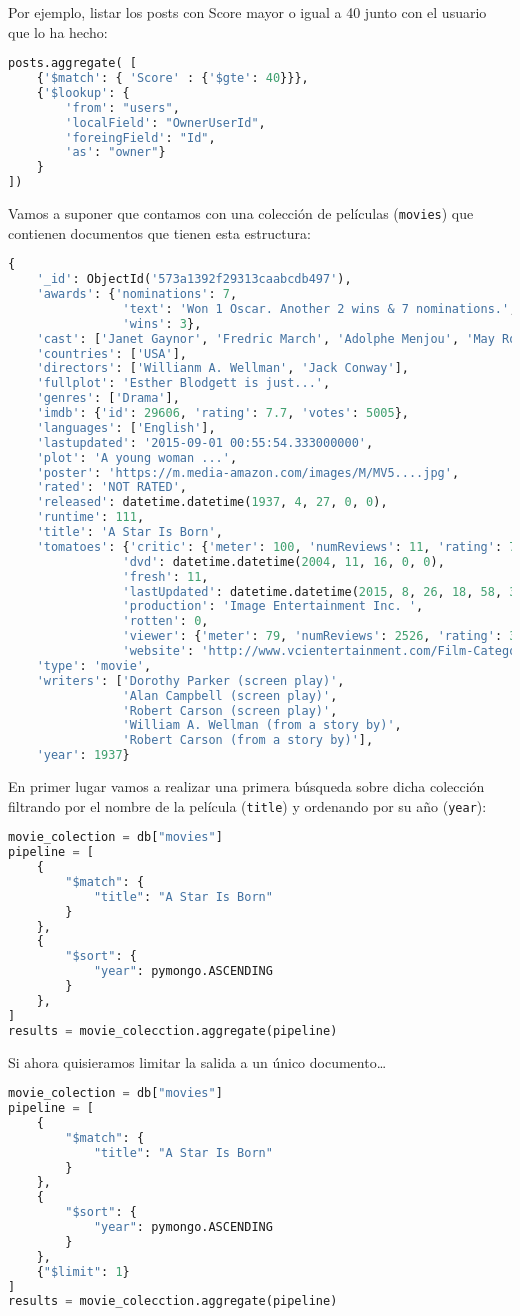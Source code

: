 Por ejemplo, listar los posts con Score mayor o igual a 40 junto con el usuario que lo ha hecho:
\begin{lstlisting}[language=python]
posts.aggregate( [
	{'$match': { 'Score' : {'$gte': 40}}},
	{'$lookup': {
		'from': "users",
		'localField': "OwnerUserId",
		'foreingField': "Id",
		'as': "owner"}
	}
])
\end{lstlisting}
Vamos a suponer que contamos con una colección de películas (\texttt{movies}) que contienen documentos que tienen esta estructura:
\begin{lstlisting}[language=python]
{
	'_id': ObjectId('573a1392f29313caabcdb497'),
	'awards': {'nominations': 7,
				'text': 'Won 1 Oscar. Another 2 wins & 7 nominations.',
				'wins': 3},
	'cast': ['Janet Gaynor', 'Fredric March', 'Adolphe Menjou', 'May Robson'],
	'countries': ['USA'],
	'directors': ['Willianm A. Wellman', 'Jack Conway'],
	'fullplot': 'Esther Blodgett is just...',
	'genres': ['Drama'],
	'imdb': {'id': 29606, 'rating': 7.7, 'votes': 5005},
	'languages': ['English'],
	'lastupdated': '2015-09-01 00:55:54.333000000',
	'plot': 'A young woman ...',
	'poster': 'https://m.media-amazon.com/images/M/MV5....jpg',
	'rated': 'NOT RATED',
	'released': datetime.datetime(1937, 4, 27, 0, 0),
	'runtime': 111,
	'title': 'A Star Is Born',
	'tomatoes': {'critic': {'meter': 100, 'numReviews': 11, 'rating': 7.4},
				'dvd': datetime.datetime(2004, 11, 16, 0, 0),
				'fresh': 11,
				'lastUpdated': datetime.datetime(2015, 8, 26, 18, 58, 34),
				'production': 'Image Entertainment Inc. ',
				'rotten': 0,
				'viewer': {'meter': 79, 'numReviews': 2526, 'rating': 3.6},
				'website': 'http://www.vcientertainment.com/Film-Categories?product_id=73'},
	'type': 'movie',
	'writers': ['Dorothy Parker (screen play)',
				'Alan Campbell (screen play)',
				'Robert Carson (screen play)',
				'William A. Wellman (from a story by)',
				'Robert Carson (from a story by)'],
	'year': 1937}
\end{lstlisting}
\Ej

En primer lugar vamos a realizar una primera búsqueda sobre dicha colección filtrando por el nombre de la película (\texttt{title}) y ordenando por su año (\texttt{year}):
\begin{lstlisting}[language=python]
movie_colection = db["movies"]
pipeline = [
	{
		"$match": {
			"title": "A Star Is Born"
		}	
	},
	{
		"$sort": {
			"year": pymongo.ASCENDING
		}
	},
]
results = movie_colecction.aggregate(pipeline)
\end{lstlisting}
Si ahora quisieramos limitar la salida a un único documento\dots
\begin{lstlisting}[language=python]
movie_colection = db["movies"]
pipeline = [
	{
		"$match": {
			"title": "A Star Is Born"
		}	
	},
	{
		"$sort": {
			"year": pymongo.ASCENDING
		}
	},
	{"$limit": 1}
]
results = movie_colecction.aggregate(pipeline)
\end{lstlisting}

